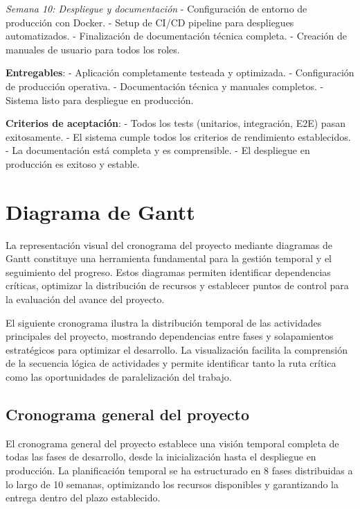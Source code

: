 \documentclass[12pt,a4paper,oneside]{report}
\begin{document}
\emph{Semana 10: Despliegue y documentación} - Configuración de entorno
de producción con Docker. - Setup de CI/CD pipeline para despliegues
automatizados. - Finalización de documentación técnica completa. -
Creación de manuales de usuario para todos los roles.

\textbf{Entregables}: - Aplicación completamente testeada y optimizada.
- Configuración de producción operativa. - Documentación técnica y
manuales completos. - Sistema listo para despliegue en producción.

\textbf{Criterios de aceptación}: - Todos los tests (unitarios,
integración, E2E) pasan exitosamente. - El sistema cumple todos los
criterios de rendimiento establecidos. - La documentación está completa
y es comprensible. - El despliegue en producción es exitoso y estable.

\section{Diagrama de Gantt}\label{diagrama-de-gantt}

La representación visual del cronograma del proyecto mediante diagramas
de Gantt constituye una herramienta fundamental para la gestión temporal
y el seguimiento del progreso. Estos diagramas permiten identificar
dependencias críticas, optimizar la distribución de recursos y
establecer puntos de control para la evaluación del avance del proyecto.

El siguiente cronograma ilustra la distribución temporal de las
actividades principales del proyecto, mostrando dependencias entre fases
y solapamientos estratégicos para optimizar el desarrollo. La
visualización facilita la comprensión de la secuencia lógica de
actividades y permite identificar tanto la ruta crítica como las
oportunidades de paralelización del trabajo.

\subsection{Cronograma general del
proyecto}\label{cronograma-general-del-proyecto}

El cronograma general del proyecto establece una visión temporal completa de todas las fases de desarrollo, desde la inicialización hasta el despliegue en producción. La planificación temporal se ha estructurado en 8 fases distribuidas a lo largo de 10 semanas, optimizando los recursos disponibles y garantizando la entrega dentro del plazo establecido.
\end{document}
